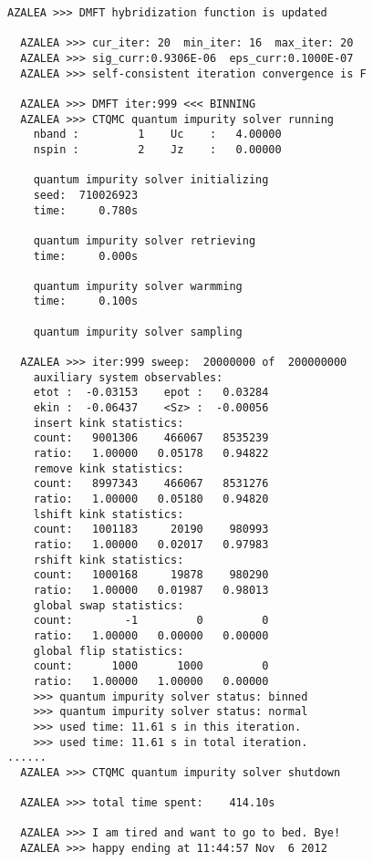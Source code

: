 \begin{lstlisting}[frame=single]
  AZALEA >>> DMFT hybridization function is updated
 
  AZALEA >>> cur_iter: 20  min_iter: 16  max_iter: 20
  AZALEA >>> sig_curr:0.9306E-06  eps_curr:0.1000E-07
  AZALEA >>> self-consistent iteration convergence is F

  AZALEA >>> DMFT iter:999 <<< BINNING
  AZALEA >>> CTQMC quantum impurity solver running
    nband :         1    Uc    :   4.00000
    nspin :         2    Jz    :   0.00000
 
    quantum impurity solver initializing
    seed:  710026923
    time:     0.780s
 
    quantum impurity solver retrieving
    time:     0.000s
 
    quantum impurity solver warmming
    time:     0.100s
 
    quantum impurity solver sampling
 
  AZALEA >>> iter:999 sweep:  20000000 of  200000000
    auxiliary system observables:
    etot :  -0.03153    epot :   0.03284
    ekin :  -0.06437    <Sz> :  -0.00056
    insert kink statistics:
    count:   9001306    466067   8535239
    ratio:   1.00000   0.05178   0.94822
    remove kink statistics:
    count:   8997343    466067   8531276
    ratio:   1.00000   0.05180   0.94820
    lshift kink statistics:
    count:   1001183     20190    980993
    ratio:   1.00000   0.02017   0.97983
    rshift kink statistics:
    count:   1000168     19878    980290
    ratio:   1.00000   0.01987   0.98013
    global swap statistics:
    count:        -1         0         0
    ratio:   1.00000   0.00000   0.00000
    global flip statistics:
    count:      1000      1000         0
    ratio:   1.00000   1.00000   0.00000
    >>> quantum impurity solver status: binned
    >>> quantum impurity solver status: normal
    >>> used time: 11.61 s in this iteration.
    >>> used time: 11.61 s in total iteration.
......
  AZALEA >>> CTQMC quantum impurity solver shutdown

  AZALEA >>> total time spent:    414.10s
 
  AZALEA >>> I am tired and want to go to bed. Bye!
  AZALEA >>> happy ending at 11:44:57 Nov  6 2012
\end{lstlisting}

